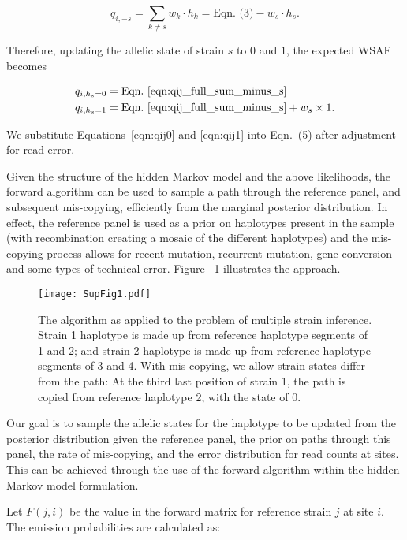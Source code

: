 \documentclass{article}
\begin{document}
\begin{equation}
q_{i,-s} = \sum_{k\neq s} w_k \cdot h_k = \textrm{Eqn.~(3)} -  w_s \cdot h_s. \label{eqn:qij_full_sum_minus_s}
\end{equation}

\noindent Therefore, updating the allelic state of strain $s$ to $0$ and $1$, the expected WSAF becomes

\begin{align}
q_{i,h_s=0} & = \textrm{Eqn.~\eqref{eqn:qij_full_sum_minus_s}} \label{eqn:qij0}\\
q_{i,h_s=1} & = \textrm{Eqn.~\eqref{eqn:qij_full_sum_minus_s}} + w_s \times 1. \label{eqn:qij1}
\end{align}

\noindent We substitute Equations~\eqref{eqn:qij0} and \eqref{eqn:qij1} into Eqn.~(5) after adjustment for read error.

Given the structure of the hidden Markov model and the above likelihoods, the forward algorithm can be used to sample a path through the reference panel, and subsequent mis-copying, efficiently from the marginal posterior distribution.  In effect, the reference panel is used as a prior on haplotypes present in the sample (with recombination creating a mosaic of the different haplotypes) and the mis-copying process allows for recent mutation, recurrent mutation, gene conversion and some types of technical error.  Figure ~\ref{fig:ls} illustrates the approach.


\begin{figure}[tbh]
\centering
\texttt{[image: SupFig1.pdf]}
\caption{The \citet{Li2003} algorithm as applied to the problem of multiple strain inference. Strain 1 haplotype is made up from reference haplotype segments of 1 and 2; and strain 2 haplotype is made up from reference haplotype segments of 3 and 4. With mis-copying, we allow strain states differ from the path: At the third last position of strain 1, the path is copied from reference haplotype 2, with the state of 0.}
\label{fig:ls}
\end{figure}


Our goal is to sample the allelic states for the haplotype to be updated from the posterior distribution given the reference panel, the prior on paths through this panel, the rate of mis-copying, and the error distribution for read counts at sites.  This can be achieved through the use of the forward algorithm within the hidden Markov model formulation.

Let $F(j,i)$ be the value in the forward matrix for reference strain $j$ at site $i$.  The emission probabilities are calculated as:
\end{document}
